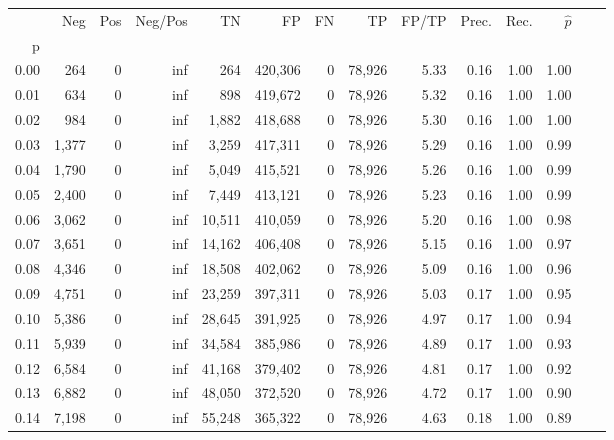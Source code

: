 \begin{tabular}{rrrrrrrrrrrrrr}
\toprule
{} &    Neg &    Pos &  Neg/Pos &       TN &       FP &      FN &      TP & FP/TP & Prec. &  Rec. & $\hat{p}$ \\
p    &        &        &          &          &          &         &         &       &       &       &           \\
\midrule
0.00 &    264 &      0 &      inf &      264 &  420,306 &       0 &  78,926 &  5.33 &  0.16 &  1.00 &      1.00 \\
0.01 &    634 &      0 &      inf &      898 &  419,672 &       0 &  78,926 &  5.32 &  0.16 &  1.00 &      1.00 \\
0.02 &    984 &      0 &      inf &    1,882 &  418,688 &       0 &  78,926 &  5.30 &  0.16 &  1.00 &      1.00 \\
0.03 &  1,377 &      0 &      inf &    3,259 &  417,311 &       0 &  78,926 &  5.29 &  0.16 &  1.00 &      0.99 \\
0.04 &  1,790 &      0 &      inf &    5,049 &  415,521 &       0 &  78,926 &  5.26 &  0.16 &  1.00 &      0.99 \\
0.05 &  2,400 &      0 &      inf &    7,449 &  413,121 &       0 &  78,926 &  5.23 &  0.16 &  1.00 &      0.99 \\
0.06 &  3,062 &      0 &      inf &   10,511 &  410,059 &       0 &  78,926 &  5.20 &  0.16 &  1.00 &      0.98 \\
0.07 &  3,651 &      0 &      inf &   14,162 &  406,408 &       0 &  78,926 &  5.15 &  0.16 &  1.00 &      0.97 \\
0.08 &  4,346 &      0 &      inf &   18,508 &  402,062 &       0 &  78,926 &  5.09 &  0.16 &  1.00 &      0.96 \\
0.09 &  4,751 &      0 &      inf &   23,259 &  397,311 &       0 &  78,926 &  5.03 &  0.17 &  1.00 &      0.95 \\
0.10 &  5,386 &      0 &      inf &   28,645 &  391,925 &       0 &  78,926 &  4.97 &  0.17 &  1.00 &      0.94 \\
0.11 &  5,939 &      0 &      inf &   34,584 &  385,986 &       0 &  78,926 &  4.89 &  0.17 &  1.00 &      0.93 \\
0.12 &  6,584 &      0 &      inf &   41,168 &  379,402 &       0 &  78,926 &  4.81 &  0.17 &  1.00 &      0.92 \\
0.13 &  6,882 &      0 &      inf &   48,050 &  372,520 &       0 &  78,926 &  4.72 &  0.17 &  1.00 &      0.90 \\
0.14 &  7,198 &      0 &      inf &   55,248 &  365,322 &       0 &  78,926 &  4.63 &  0.18 &  1.00 &      0.89 \\

\end{tabular}
